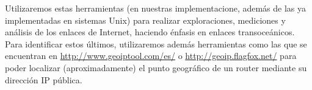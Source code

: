 
Utilizaremos estas herramientas (en nuestras implementacione, además de las ya implementadas en sistemas Unix) para realizar exploraciones, mediciones y an\'alisis de los enlaces de Internet, haciendo énfasis en enlaces transoceánicos. Para identificar estos últimos, utilizaremos además herramientas como las que se encuentran en \url{http://www.geoiptool.com/es/} o \url{http://geoip.flagfox.net/} para poder localizar (aproximadamente) el punto geogr\'afico de un router mediante su dirección IP pública.


